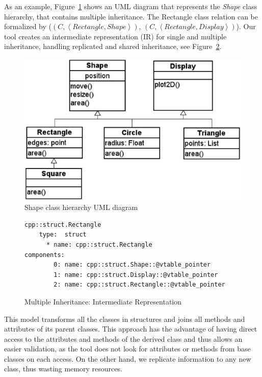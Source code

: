 \documentclass[a4paper]{llncs}
\begin{document}
As an example, Figure~\ref{figure:uml_diagram} shows an UML diagram
that represents the \textit{Shape} class hierarchy, that contains multiple inheritance.
The Rectangle class relation can be formalized by
($\left(C, \left\langle Rectangle, Shape \right\rangle \right)$,
$\left(C, \left\langle Rectangle, Display \right\rangle \right)$).
Our tool creates an intermediate representation (IR) for single and multiple inheritance, handling
replicated and shared inheritance, see Figure~\ref{figure:multiple-inheritance-IR}.

\begin{figure}[ht]
\centering
\includegraphics[scale=0.4]{figures/inheritance_uml}
\caption{Shape class hierarchy UML diagram}
\label{figure:uml_diagram}
\end{figure}


\begin{figure}[h]
\centering
\begin{minipage}{0.9\textwidth}
\begin{lstlisting}[style=nonumbers]
cpp::struct.Rectangle
    type:  struct
      * name: cpp::struct.Rectangle
components:
        0: name: cpp::struct.Shape::@vtable_pointer
        1: name: cpp::struct.Display::@vtable_pointer
        2: name: cpp::struct.Rectangle::@vtable_pointer
\end{lstlisting}
\end{minipage}
\caption{Multiple Inheritance: Intermediate Representation}
\label{figure:multiple-inheritance-IR}
\end{figure}

This model transforms all the classes in structures and joins all
methods and attributes of its parent classes. This approach has
the advantage of having direct access to the attributes and methods
of the derived class and thus allows an easier validation, as the tool
does not look for attributes or methods from base classes on each access.
On the other hand, we replicate information to any new class, thus wasting
memory resources.
\end{document}
